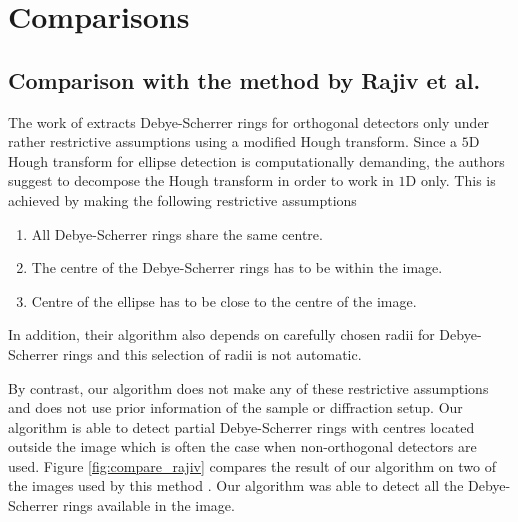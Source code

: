 \documentclass[preprint]{iucr}              %
\newcommand\dsrs{Debye-Scherrer rings}
\begin{document}
\section{Comparisons}
\label{sec:compr}
\subsection{\textbf{Comparison with the method by Rajiv et al.}}
\label{sec:rajiv}
{The work of \cite{PDJ:8503397} extracts \dsrs{} for orthogonal detectors only under rather restrictive assumptions using a modified Hough transform. Since a $5$D Hough transform for ellipse detection is computationally demanding, the authors suggest to decompose the Hough transform in order to work in $1$D only. This is achieved by making the following restrictive assumptions
\begin{enumerate}
    \item All {\dsrs} share the same centre.
    \item The centre of the {\dsrs} has to be within the image.
    \item Centre of the ellipse has to be close to the centre of the image.
\end{enumerate}
In addition, their algorithm also depends on carefully chosen radii for \dsrs{} and this selection of radii is not automatic.
}

{By contrast, our algorithm does not make any of these restrictive assumptions and does not use prior information of the sample or diffraction setup. Our algorithm is able to detect partial \dsrs{} with centres located outside the image which is often the case when non-orthogonal detectors are used. Figure \ref{fig:compare_rajiv} compares the result of our algorithm on two of the images used by this method \cite{PDJ:8503397}. Our algorithm was able to detect all the {\dsrs} available in the image.
}
\end{document}
